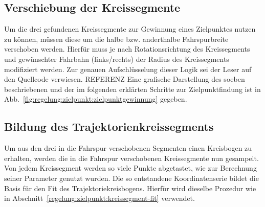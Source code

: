 \subsection{Verschiebung der Kreissegmente}
Um die drei gefundenen Kreissegmente zur Gewinnung eines Zielpunktes nutzen zu können, müssen diese um die halbe bzw. anderthalbe Fahrspurbreite verschoben werden. Hierfür muss je nach Rotationsrichtung des Kreissegments und gewünschter Fahrbahn (links/rechts) der Radius des Kreissegments modifiziert werden. Zur genauen Aufschlüsselung dieser Logik sei der Leser auf den Quellcode verwiesen. REFERENZ Eine grafische Darstellung des soeben beschriebenen und der im folgenden erklärten Schritte zur Zielpunktfindung ist in Abb.~\ref{fig:regelung:zielpunkt:zielpunktgewinnung} gegeben.

\subsection{Bildung des Trajektorienkreissegments}
Um aus den drei in die Fahrspur verschobenen Segmenten einen Kreisbogen zu erhalten, werden die in die Fahrspur verschobenen Kreissegmente nun gesampelt. Von jedem Kreissegment werden so viele Punkte abgetastet, wie zur Berechnung seiner Parameter genutzt wurden. Die so entstandene Koordinatenserie bildet die Basis für den Fit des Trajektoriekreisbogens. Hierfür wird dieselbe Prozedur wie in  Abschnitt~\ref{regelung:zielpunkt:kreissegment-fit} verwendet.

